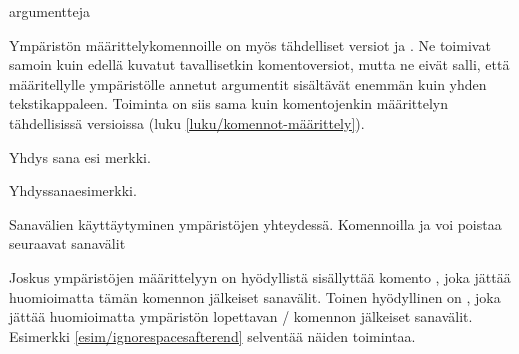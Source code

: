 \begin{koodilohkosis}
\begin{ymp}[valinnainen]{argu}{mentteja}
\end{ymp}
\end{koodilohkosis}

\noindent
Ympäristön määrittelykomennoille on myös tähdelliset versiot
 ja . Ne toimivat
samoin kuin edellä kuvatut tavallisetkin komentoversiot, mutta ne eivät
salli, että määritellylle ympäristölle annetut argumentit sisältävät
enemmän kuin yhden tekstikappaleen. Toiminta on siis sama kuin
komentojenkin määrittelyn tähdellisissä versioissa (luku
\ref{luku/komennot-määrittely}).

\begin{koodilohkosis}
\newenvironment*   {nimi}[n][oletus]{aloitus}{lopetus}
\renewenvironment* {nimi}[n][oletus]{aloitus}{lopetus}
\end{koodilohkosis}

\begin{esimerkki*}

\begin{koodilohko}
\newenvironment{ymp}
{Yhdys\ignorespaces}
{esi\ignorespacesafterend}

\begin{ymp}
  sana%
\end{ymp}   merkki.
\end{koodilohko}
\begin{tulos}
  Yhdyssanaesimerkki.
\end{tulos}
\caption{Sanavälien käyttäytyminen ympäristöjen yhteydessä. Komennoilla
   ja  voi poistaa
  seuraavat sanavälit}
\label{esim/ignorespacesafterend}
\end{esimerkki*}

\noindent
Joskus ympäristöjen määrittelyyn on hyödyllistä sisällyttää komento
, joka jättää huomioimatta tämän komennon
jälkeiset sanavälit. Toinen hyödyllinen on
, joka jättää huomioimatta ympäristön
lopettavan \-/ komennon jälkeiset sanavälit. Esimerkki
\ref{esim/ignorespacesafterend} selventää näiden toimintaa.

